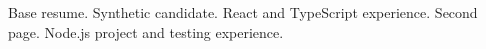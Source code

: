 \documentclass[a4paper]{article}
\begin{document}
Base resume. Synthetic candidate. React and TypeScript experience.
\newpage
Second page. Node.js project and testing experience.
\end{document}
